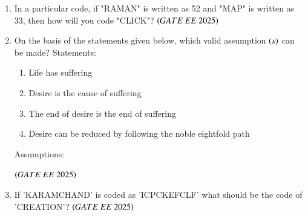 \documentclass[journal,12pt,onecolumn]{IEEEtran}
\theoremstyle{remark}
\begin{document}
\begin{enumerate}
   \item In a particular code, if "RAMAN" is written as 52 and "MAP" is written as 33, then how will you code "CLICK"?      
\hfill $\brak{GATE\ EE\ 2025}$
    \begin{enumerate}
    \end{enumerate}

   \item On the basis of the statements given below, which valid assumption $\brak{s}$ can be made?    
      Statements:
\begin{enumerate}
    \item Life has suffering
    \item Desire is the cause of suffering
    \item The end of desire is the end of suffering
    \item Desire can be reduced by following the noble eightfold path
\end{enumerate}
Assumptions:
\begin{enumerate}
 \end{enumerate}    
\hfill $\brak{GATE\ EE\ 2025}$
    \begin{enumerate}
     \end{enumerate}
  \item If 'KARAMCHAND' is coded as 'ICPCKEFCLF' what should be the code of 'CREATION'?  
\hfill $\brak{GATE\ EE\ 2025}$
    \begin{enumerate}

\end{enumerate}
\end{enumerate}
\end{document}
